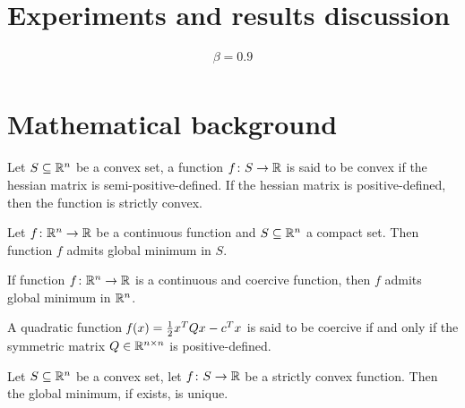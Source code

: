\section{Experiments and results discussion}

\[
\begin{array}{l}
\beta=0.9 \\
\end{array}
\]

\cleardoublepage
\section{Mathematical background}

\begin{defs}\label{def:conv_fun}
	Let $S\subseteq\mathbb{R}^n$ be a convex set, a function $f\colon S\to\mathbb{R}$ is said to be convex if the hessian matrix is semi-positive-defined. If the hessian matrix is positive-defined, then the function is strictly convex.
\end{defs}

\begin{thm}\label{thm:weirs}
	Let $f\colon\mathbb{R}^n\to\mathbb{R}$ be a continuous function and $S\subseteq\mathbb{R}^n$ a compact set. Then function $f$ admits global minimum in $S$.
\end{thm}

\begin{cor}\label{cor:weirs1}
	If function $f\colon\mathbb{R}^n\to\mathbb{R}$ is a continuous and coercive function, then $f$ admits global minimum in $\mathbb{R}^n$.
\end{cor}

\begin{prop}
	A quadratic function $\operatorname*{\mathit{f}}(x)=\frac{1}{2}x^TQx-c^Tx$ is said to be coercive if and only if the symmetric matrix $Q\in\mathbb{R}^{n\times n}$ is positive-defined.
\end{prop}

\begin{prop}\label{prop:min_unique}
	Let $S\subseteq\mathbb{R}^n$ be a convex set, let $f\colon S\to\mathbb{R}$ be a strictly convex function. Then the global minimum, if exists, is unique.
\end{prop}

